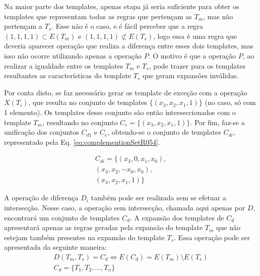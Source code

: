 Na maior parte dos templates, apenas etapa já seria suficiente para obter os templates que representam todas as regras que pertençam as $T_m$, mas não pertençam a $T_s$. Esse não é o caso, e é fácil perceber que a regra $(1,1,1,1) \subset E(T_m)$ e $(1,1,1,1) \not\subset E(T_s)$, logo essa é uma regra que deveria aparecer operação que realiza a diferença entre esses dois templates, mas isso não ocorre utilizando apenas a operação $P$. O motivo é que a operação $P$, ao realizar a igualdade entre os templates $T_m$ e $T_s$, pode trazer para os templates resultantes as características do template $T_s$ que geram expansões inválidas.

Por conta disto, se faz necessário gerar os template de exceção com a operação $X(T_i)$, que resulta no conjunto de templates $\{(x_3, x_2, x_1, 1)\}$ (no caso, só com 1 elemento). Os templates desse conjunto são então interseccionados com o template $T_m$, resultando no conjunto $C_e = \{(x_3, x_2, x_1, 1)\}$. Por fim, faz-se a unificação dos conjuntos $C_{d1}$ e $C_e$, obtendo-se o conjunto de templates $C_{di}$, representado pela Eq. \ref{eq:complementionSetR054}.

\begin{equation}
\begin{split}
C_{di} = \{(x_3, 0, x_1, x_0), \\(x_3, x_2, -x_0, x_0),\\ (x_3, x_2, x_1, 1)\}
\end{split}
\label{eq:complementionSetR054}
\end{equation}

A operação de diferença $D_i$ também pode ser realizada sem se efetuar a intersecção. Nesse caso, a operação sem intersecção, chamada aqui apenas por $D$, encontrará um conjunto de templates $C_d$. A expansão dos templates de $C_{d}$ apresentará apenas as regras geradas pela expansão do template $T_m$ que não estejam também presentes na expansão do template $T_s$. Essa operação pode ser apresentada da seguinte maneira:
\begin{equation}
\begin{split}
D(T_m,T_s)= C_d \Leftrightarrow E(C_d) = E(T_m) \setminus E(T_s) \\
C_d = \{T_1,T_2,\dots, T_n\}\\
\end{split}
\end{equation}

